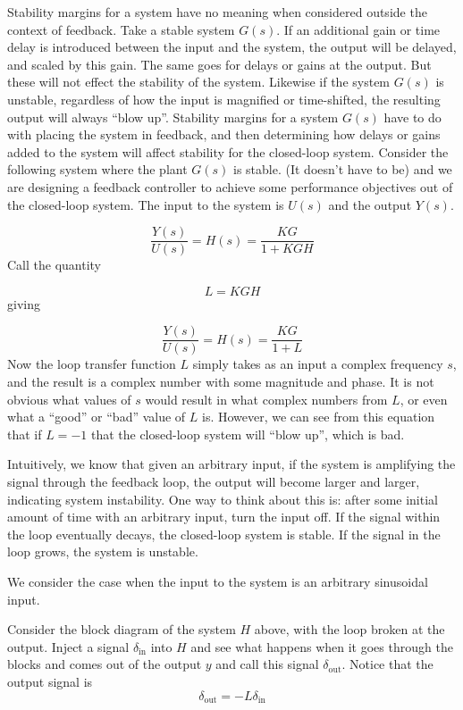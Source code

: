 Stability margins for a system have no meaning when considered outside the context of feedback.
Take a stable system $G(s)$.
If an additional gain or time delay is introduced between the input and the system, the output will be delayed, and scaled by this gain.
The same goes for delays or gains at the output.
But these will not effect the stability of the system.
Likewise if the system $G(s)$ is unstable, regardless of how the input is magnified or time-shifted, the resulting output will always ``blow up''.
Stability margins for a system $G(s)$ have to do with placing the system in feedback, and then determining how delays or gains added to the system will affect stability for the closed-loop system.
Consider the following system where the plant $G(s)$ is stable.
(It doesn't have to be) and we are designing a feedback controller to achieve some performance objectives out of the closed-loop system.
The input to the system is $U(s)$ and the output $Y(s)$.

\begin{equation*}
  \frac{Y(s)}{U(s)}=H(s)=\frac{KG}{1+KGH}
\end{equation*}
Call the quantity

\begin{equation*}
  L=KGH
\end{equation*}
giving

\begin{equation*}
  \frac{Y(s)}{U(s)}=H(s)=\frac{KG}{1+L}
\end{equation*}
Now the loop transfer function $L$ simply takes as an input a complex frequency $s$, and the result is a complex number with some magnitude and phase.
It is not obvious what values of $s$ would result in what complex numbers from $L$, or even what a ``good'' or ``bad'' value of $L$ is.
However, we can see from this equation that if $L=-1$ that the closed-loop system will ``blow up'', which is bad.

Intuitively, we know that given an arbitrary input, if the system is amplifying the signal through the feedback loop, the output will become larger and larger, indicating system instability.
One way to think about this is: after some initial amount of time with an arbitrary input, turn the input off.
If the signal within the loop eventually decays, the closed-loop system is stable.
If the signal in the loop grows, the system is unstable.

We consider the case when the input to the system is an arbitrary sinusoidal input.

Consider the block diagram of the system $H$ above, with the loop broken at the output.
Inject a signal $\delta_{\text{in}}$ into $H$ and see what happens when it goes through the blocks and comes out of the output $y$ and call this signal $\delta_{\text{out}}$.
Notice that the output signal is
\begin{equation*}
  \delta_{\text{out}}=-L\delta_{\text{in}}
\end{equation*}

